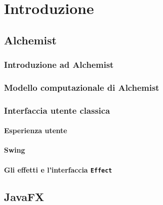 

\chapter{Introduzione}\label{ch:intro}
  \section{Alchemist}\label{sec:alchemist}
    \subsection{Introduzione ad Alchemist}\label{sub:introAlchemist}
    \subsection{Modello computazionale di Alchemist}\label{sub:modelloComputazionale}
    \subsection{Interfaccia utente classica}\label{sub:prevGui}
      \subsubsection{Esperienza utente}\label{subsub:prevUx}
      \subsubsection{Swing}\label{subsub:swing}
      \subsubsection{Gli effetti e l'interfaccia \texttt{Effect}}\label{subsub:effect}
  \section{JavaFX}\label{sec:jfx}
